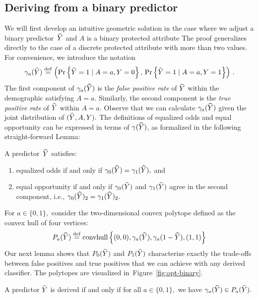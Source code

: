 \subsection{Deriving from a binary predictor}
\label{sec:opt-binary}

We will first develop an intuitive geometric solution in the case where we
adjust a binary predictor~$\widehat{Y}$ and $A$ is a binary protected attribute The
proof generalizes directly to the case of a discrete protected attribute with
more than two values. For convenience, we introduce the notation
\begin{equation}\label{eq:gamma}
\gamma_a(\widehat{Y}) \stackrel{\small \mathrm{def}}{=} \left(
\Pr\left\{ \widehat{Y} = 1 \mid A=a, Y=0\right\},\,
\Pr\left\{ \widehat{Y} = 1 \mid A=a, Y=1\right\}
\right)\,.
\end{equation}
The first component of $\gamma_a(\widehat{Y})$ is the \emph{false positive rate} of
$\widehat{Y}$ within the demographic satisfying $A=a.$ Similarly, the second
component is the \emph{true positive rate} of $\widehat{Y}$ within $A=a.$
Observe that we can calculate $\gamma_a(\widehat{Y})$ given the
joint distribution of $(\widehat{Y}, A, Y).$
The definitions of equalized odds and equal opportunity can be
expressed in terms of $\gamma(\widehat{Y})$,  as formalized in the following
straight-forward Lemma:
\begin{lemma}
\label{lem:gamma}
A predictor~$\widehat{Y}$ satisfies:
\begin{enumerate}
\item  equalized odds if and only if
$\gamma_0(\widehat{Y})=\gamma_1(\widehat{Y}),$ and
\item equal opportunity 
if and only if $\gamma_0(\widehat{Y})$ and
$\gamma_1(\widehat{Y})$ agree in the second component, i.e.,
$\gamma_0(\widehat{Y})_2 = \gamma_1(\widehat{Y})_2.$
\end{enumerate}
\end{lemma}
For $a\in\{0,1\},$ consider the two-dimensional convex polytope defined as the
convex hull of four vertices:
\begin{align}
P_a(\widehat{Y})  \stackrel{\small \mathrm{def}}{=}
\mathrm{convhull}\left\{ (0,0), \gamma_a(\widehat{Y}), \gamma_a(1-\widehat{Y}),(1,1)\right\}
\end{align}
Our next lemma shows that $P_0(\widehat{Y})$ and $P_1(\widehat{Y})$ characterize exactly
the trade-offs between false positives and true positives that we can achieve
with any derived classifier. The polytopes are visualized
in~Figure~\ref{fig:opt-binary}.
%
\begin{lemma}
\label{lem:derived}
A predictor $\widetilde{Y}$ is derived if and only if for all $a\in\{0,1\},$
we have $\gamma_a(\widetilde{Y})\in P_a(\widehat{Y}).$
\end{lemma}
